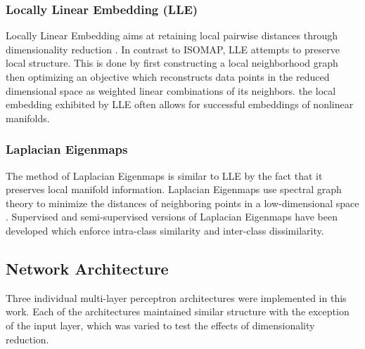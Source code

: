\documentclass[conference]{IEEEtran}
\begin{document}
	\subsubsection*{Locally Linear Embedding (LLE)} Locally Linear Embedding aims at retaining local pairwise distances through dimensionality reduction \cite{Roweis2000LLE,Saul2001LLEIntro}.  In contrast to ISOMAP, LLE attempts to preserve local structure.  This is done by first constructing a local neighborhood graph then optimizing an objective which reconstructs data points in the reduced dimensional space as weighted linear combinations of its neighbors.  the local embedding exhibited by LLE often allows for successful embeddings of nonlinear manifolds.
	\subsubsection*{Laplacian Eigenmaps}  The method of Laplacian Eigenmaps is similar to LLE by the fact that it preserves local manifold information.  Laplacian Eigenmaps use spectral graph theory to minimize the distances of neighboring points in a low-dimensional space \cite{Belkin2003LaplacianEigenmaps,VanDerMaaten2009DRReview}.  Supervised and semi-supervised versions of Laplacian Eigenmaps have been developed which enforce intra-class similarity and inter-class dissimilarity.  
	 

	\subsection{Network Architecture}
	Three individual multi-layer perceptron architectures were implemented in this work.  Each of the architectures maintained similar structure with the exception of the input layer, which was varied to test the effects of dimensionality reduction.  
	
	
	
\end{document}
